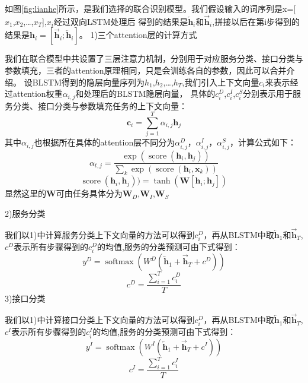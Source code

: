 如图\ref{fig:lianhe}所示，是我们选择的联合识别模型。我们假设输入的词序列是x=[$x_{1}$,$x_{2}$,\dots,$x_{T}$],$x_{i}$经过双向LSTM处理后
得到的结果是$\overleftarrow{\mathbf{h}}_{i}$和$\overrightarrow{\mathbf{h}}_{i}$,拼接以后在第i步得到的结果是$\mathbf{h}_{i}=[\overrightarrow{\mathbf{h}}_{i} ;\overleftarrow{\mathbf{h}}_{i}]$。
1)三个attention层的计算方式

我们在联合模型中共设置了三层注意力机制，分别用于对应服务分类、接口分类与参数填充，三者的attention原理相同，只是会训练各自的参数，因此可以合并介绍。
设BLSTM得到的隐层向量序列为$h_{1}$,$h_{2}$,\dots,$h_{T}$,我们引入上下文向量${c}_{i}$来表示经过attention权重$α_{i,j}$和处理后的BLSTM隐层向量，
具体的${c}_{i}^{D}$,${c}_{i}^{I}$,${c}_{i}^{S}$分别表示用于服务分类、接口分类与参数填充任务的上下文向量：
\begin{equation}
    \mathbf{c}_{i}=\sum_{j=1}^{T} \alpha_{i, j} \mathbf{h}_{j}
  \end{equation}
  其中$\alpha_{i, j}$也根据所在具体的attention层不同分为$\alpha_{i, j}^{D}$，$\alpha_{i, j}^{I}$，$\alpha_{i, j}^{S}$，计算公式如下：
  \begin{equation}
    \alpha_{t, j}=\frac{\exp \left(\operatorname{score}\left(\mathbf{h}_{i}, \mathbf{h}_{j}\right)\right)}{\sum_{k} \exp \left(\operatorname{score}\left(\mathbf{h}_{i}, \mathbf{x}_{k}\right)\right)}
    \end{equation}
    \begin{equation}
      \operatorname{score}(\mathbf{h}_{i}, \mathbf{h}_{j}))=\tanh \left(\mathbf{W}\left[\mathbf{h}_{i} ; \mathbf{h}_{j}\right]\right)
    \end{equation}
显然这里的$\mathbf{W}$可由任务具体分为$\mathbf{W}_D$,$\mathbf{W}_I$,$\mathbf{W}_S$

2)服务分类

我们以1)中计算服务分类上下文向量的方法可以得到${c}_{i}^{D}$，再从BLSTM中取$\overleftarrow{\mathbf{h}}_{1}$和$\overrightarrow{\mathbf{h}}_{T}$,
$c^{D}$表示所有步骤得到的$c_i^{D}$的均值,服务的分类预测可由下式得到：
\begin{equation}
    y^{D}=\operatorname{softmax}\left(W^{D}\left(\overleftarrow{\mathbf{h}}_{1}+\overrightarrow{\mathbf{h}}_{T}+c^{D}\right)\right)
  \end{equation}
  \begin{equation}
    c^{D}=\frac{\sum_{i=1}^{T} c_i^{D}}{T}
  \end{equation}
3)接口分类

  我们以1)中计算接口分类上下文向量的方法可以得到${c}_{i}^{D}$，再从BLSTM中取$\overleftarrow{\mathbf{h}}_{1}$和$\overrightarrow{\mathbf{h}}_{T}$,
  $c^{I}$表示所有步骤得到的$c_i^{I}$的均值,服务的分类预测可由下式得到：
  \begin{equation}
      y^{I}=\operatorname{softmax}\left(W^{I}\left(\overleftarrow{\mathbf{h}}_{1}+\overrightarrow{\mathbf{h}}_{T}+c^{I}\right)\right)
    \end{equation} 
    \begin{equation}
        c^{I}=\frac{\sum_{i=1}^{T} c_i^{I}}{T}
      \end{equation}


